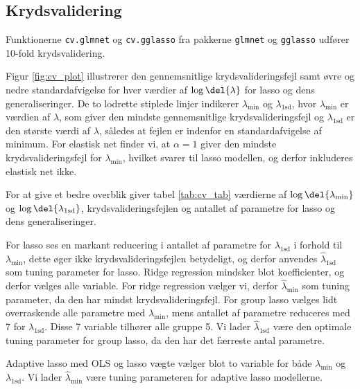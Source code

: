 \subsection{Krydsvalidering}
Funktionerne \texttt{cv.glmnet} og \texttt{cv.gglasso} fra pakkerne \texttt{glmnet} og \texttt{gglasso} udfører 10-fold krydsvalidering.

Figur \ref{fig:cv_plot} illustrerer den gennemsnitlige krydsvalideringsfejl samt øvre og nedre standardafvigelse for hver værdier af $\log \del{\lambda}$ for lasso og dens generaliseringer. 
De to lodrette stiplede linjer indikerer \(\lambda_{\text{min}}\) og \(\lambda_\text{1sd}\), hvor \(\lambda_{\text{min}}\) er værdien af \(\lambda\), som giver den mindste gennemsnitlige krydsvalideringsfejl og \(\lambda_\text{1sd}\) er den største værdi af \(\lambda\), således at fejlen er indenfor en standardafvigelse af minimum. 
For elastisk net finder vi, at $\alpha =1$ giver den mindste krydsvalideringsfejl for \(\lambda_\text{min}\), hvilket svarer til lasso modellen, og derfor inkluderes elastisk net ikke. 
%
%



For at give et bedre overblik giver tabel \ref{tab:cv_tab} værdierne af $\log \del{ \lambda_{\min}}$ og $\log \del{ \lambda_{1\text{sd}}}$, krydsvalideringsfejlen og antallet af parametre for lasso og dens generaliseringer.

For lasso ses en markant reducering i antallet af parametre for $\lambda_{1\text{sd}}$ i forhold til $\lambda_{\min}$, dette øger ikke krydsvalideringsfejlen betydeligt, og derfor anvendes $\widehat{\lambda}_{1\text{sd}}$ som tuning parameter for lasso. 
Ridge regression mindsker blot koefficienter, og derfor vælges alle variable.
For ridge regression vælger vi, derfor $\widehat{\lambda}_{\min}$ som tuning parameter, da den har mindst krydsvalideringsfejl.
For group lasso vælges lidt overraskende alle parametre med \(\lambda_\text{min}\), mens antallet af parametre reduceres med 7 for $\lambda_{1\text{sd}}$. Disse 7 variable tilhører alle gruppe 5.
Vi lader $\widehat{\lambda}_{1\text{sd}}$ være den optimale tuning parameter for group lasso, da den har det færreste antal parametre. 

Adaptive lasso med OLS og lasso vægte vælger blot to variable for både  $\lambda_{\min}$ og $\lambda_{1\text{sd}}$. 
Vi lader $\widehat{\lambda}_{\min}$ være tuning parameteren for adaptive lasso modellerne. 

